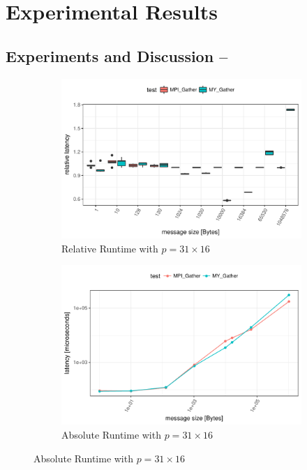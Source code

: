 \section{Experimental Results}

\subsection{Experiments and Discussion -- \mygather}

\begin{figure}[H]
    \centering
    
    \begin{subfigure}[b]{0.49\textwidth}
        \includegraphics[width=\textwidth]{../benchmarks/openmpi/binom/gather_31/rel_runtime.pdf}
        \caption{Relative Runtime with $p=31 \times 16$}
        \label{fig:Gather:OpenMPI:Rel:31}
    \end{subfigure}
    \begin{subfigure}[b]{0.49\textwidth}
        \includegraphics[width=\textwidth]{../benchmarks/openmpi/binom/gather_31/runtime.pdf}
        \caption{Absolute Runtime with $p=31 \times 16$}
        \label{fig:Gather:OpenMPI:Abs:31}
    \end{subfigure}
    

\end{figure}
